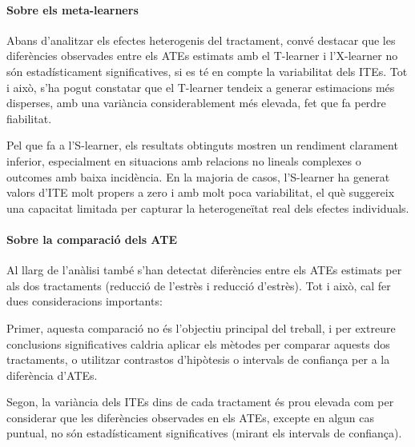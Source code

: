 \documentclass[../main.tex]{subfiles}
\begin{document}
    \paragraph{Sobre els meta-learners} Abans d’analitzar els efectes heterogenis del tractament, convé destacar que les diferències observades entre els ATEs estimats amb el T-learner i l’X-learner no són estadísticament significatives, si es té en compte la variabilitat dels ITEs. Tot i això, s’ha pogut constatar que el T-learner tendeix a generar estimacions més disperses, amb una variància considerablement més elevada, fet que fa perdre fiabilitat.\par
    Pel que fa a l’S-learner, els resultats obtinguts mostren un rendiment clarament inferior, especialment en situacions amb relacions no lineals complexes o outcomes amb baixa incidència. En la majoria de casos, l’S-learner ha generat valors d’ITE molt propers a zero i amb molt poca variabilitat, el què suggereix una capacitat limitada per capturar la heterogeneïtat real dels efectes individuals.

    \paragraph{Sobre la comparació dels ATE} Al llarg de l’anàlisi també s’han detectat diferències entre els ATEs estimats per als dos tractaments (reducció de l’estrès i reducció d'estrès). Tot i això, cal fer dues consideracions importants:\par
    Primer, aquesta comparació no és l’objectiu principal del treball, i per extreure conclusions significatives caldria aplicar els mètodes per comparar aquests dos tractaments, o utilitzar contrastos d’hipòtesis o intervals de confiança per a la diferència d’ATEs.\par
    Segon, la variància dels ITEs dins de cada tractament és prou elevada com per considerar que les diferències observades en els ATEs, excepte en algun cas puntual, no són estadísticament significatives (mirant els intervals de confiança).

    


    
\end{document}

